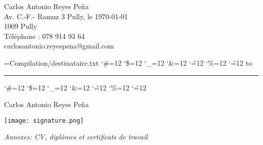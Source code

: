 \documentclass{article}
\newcommand{\readtextfile}[1]{%
    \begingroup
    \catcode`\#=12 %
    \catcode`\$=12 %
    \catcode`\_=12 %
    \catcode`\&=12 %
    \catcode`\~=12 %
    \catcode`\%=12 %
    \catcode`\^=12 %
    \endgroup
}
\begin{document}
\sffamily%

\newcommand{\readdestfile}[1]{
    \newread\file
    \openin\file=#1
    \begingroup
    \obeylines
    \everypar{\tabto{30em}}
    \catcode`\#=12 %
    \catcode`\$=12 %
    \catcode`\_=12 %
    \catcode`\&=12 %
    \catcode`\~=12 %
    \catcode`\%=12 %
    \catcode`\^=12 %
    \loop\unless\ifeof\file
        \read\file to \line
        \ifeof\file\else\line\par\fi
    \repeat
    \closein\file
    \endgroup
}

Carlos Antonio Reyes Peña \\
Av. C.-F.- Ramuz 3 \tabto{30em} Pully, le \today \\
1009 Pully \\
Téléphone : 078 914 93 64 \\
carlosantonio.reyespena@gmail.com




\begingroup
\parskip=0pt %
\readdestfile{Compilation/destinataire.txt}
\endgroup

\bigskip
\bigskip
\bigskip


\vspace*{0.6in} %
\textbf{}
\vspace{0.1\baselineskip} %
\hrule height 0.5pt %



\readtextfile{Compilation/corp.txt} %


\bigskip
\bigskip


\tabto{30em} Carlos Antonio Reyes Peña
\bigskip

\tabto{30em}\texttt{[image: signature.png]} %

\vfill %

\begin{minipage}[t]{\textwidth}
\textit{Annexes: CV, diplômes et certificats de travail}
\end{minipage}
\end{document}
